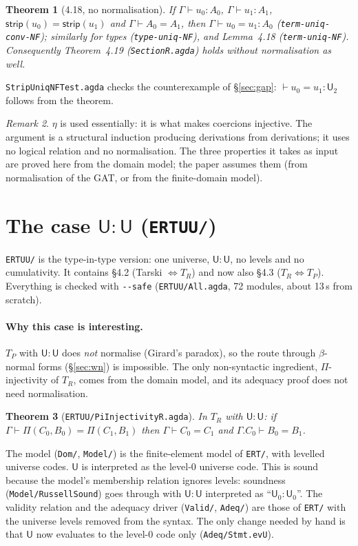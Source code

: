 \documentclass[10pt]{article}
\newcommand{\U}{\mathsf{U}}
\newcommand{\strip}{\mathsf{strip}}
\newcommand{\TR}{T_R}
\newcommand{\TP}{T_P}
\newcommand{\agda}[1]{\texttt{#1}}
\newtheorem{theorem}{Theorem}
\theoremstyle{remark}
\newtheorem{remark}[theorem]{Remark}
\begin{document}
\begin{theorem}[4.18, no normalisation]
If $\Gamma\vdash u_0:A_0$, $\Gamma\vdash u_1:A_1$, $\strip(u_0)=\strip(u_1)$ and
$\Gamma\vdash A_0=A_1$, then $\Gamma\vdash u_0=u_1:A_0$
(\agda{term-uniq-conv-NF}); similarly for types (\agda{type-uniq-NF}), and
Lemma~4.18 (\agda{term-uniq-NF}).  Consequently Theorem~4.19
(\agda{SectionR.agda}) holds without normalisation as well.
\end{theorem}
\noindent
\agda{StripUniqNFTest.agda} checks the counterexample of \S\ref{sec:gap}:
$\vdash u_0=u_1:\U_2$ follows from the theorem.

\begin{remark}
$\eta$ is used essentially: it is what makes coercions injective.
The argument is a structural induction producing derivations from
derivations; it uses no logical relation and no normalisation.  The three
properties it takes as input are proved here from the domain model; the
paper assumes them (from normalisation of the GAT, or from the finite-domain
model).
\end{remark}


\section{The case $\U:\U$ (\texttt{ERTUU/})}\label{sec:uu}

\texttt{ERTUU/} is the type-in-type version: one universe, $\U:\U$,
no levels and no cumulativity.  It contains §4.2 (Tarski
$\Leftrightarrow\TR$) and now also §4.3 ($\TR\Leftrightarrow\TP$).
Everything is checked with \verb|--safe| (\agda{ERTUU/All.agda},
72 modules, about 13\,s from scratch).

\paragraph{Why this case is interesting.}  $\TP$ with $\U:\U$ does
\emph{not} normalise (Girard's paradox), so the route through
$\beta$-normal forms (\S\ref{sec:wn}) is impossible.  The only
non-syntactic ingredient, $\Pi$-injectivity of $\TR$, comes from the
domain model, and its adequacy proof does not need normalisation.

\begin{theorem}[\agda{ERTUU/PiInjectivityR.agda}]
In $\TR$ with $\U:\U$: if $\Gamma\vdash\Pi(C_0,B_0)=\Pi(C_1,B_1)$ then
$\Gamma\vdash C_0=C_1$ and $\Gamma.C_0\vdash B_0=B_1$.
\end{theorem}
\noindent
The model (\texttt{Dom/}, \texttt{Model/}) is the finite-element model
of \texttt{ERT/}, with levelled universe codes.  $\U$ is interpreted
as the level-0 universe code.  This is sound because the model's
membership relation ignores levels: soundness
(\agda{Model/RussellSound}) goes through with $\U:\U$ interpreted as
``$\U_0:\U_0$''.  The validity relation and the adequacy driver
(\texttt{Valid/}, \texttt{Adeq/}) are those of \texttt{ERT/} with
the universe levels removed from the syntax.  The only change needed by
hand is that $\U$ now evaluates to the level-0 code only
(\agda{Adeq/Stmt.evU}).
\end{document}
